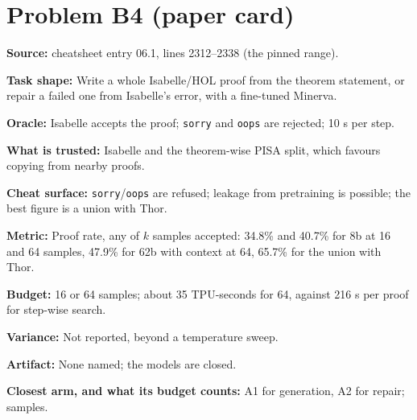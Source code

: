 \documentclass[11pt]{article}
\begin{document}
\section*{Problem B4 (paper card)}\label{ans:B4}
\begin{answer}
\textbf{Source:} cheatsheet entry 06.1, lines 2312--2338 (the pinned range).

\textbf{Task shape:} Write a whole Isabelle/HOL proof from the theorem statement, or
repair a failed one from Isabelle's error, with a fine-tuned Minerva.

\textbf{Oracle:} Isabelle accepts the proof; \texttt{sorry} and \texttt{oops} are
rejected; 10 s per step.

\textbf{What is trusted:} Isabelle and the theorem-wise PISA split, which favours
copying from nearby proofs.

\textbf{Cheat surface:} \texttt{sorry}/\texttt{oops} are refused; leakage from
pretraining is possible; the best figure is a union with Thor.

\textbf{Metric:} Proof rate, any of $k$ samples accepted: 34.8\% and 40.7\% for 8b at
16 and 64 samples, 47.9\% for 62b with context at 64, 65.7\% for the union with Thor.

\textbf{Budget:} 16 or 64 samples; about 35 TPU-seconds for 64, against 216 s per
proof for step-wise search.

\textbf{Variance:} Not reported, beyond a temperature sweep.

\textbf{Artifact:} None named; the models are closed.

\textbf{Closest arm, and what its budget counts:} A1 for generation, A2 for repair;
samples.
\end{answer}

\end{document}

